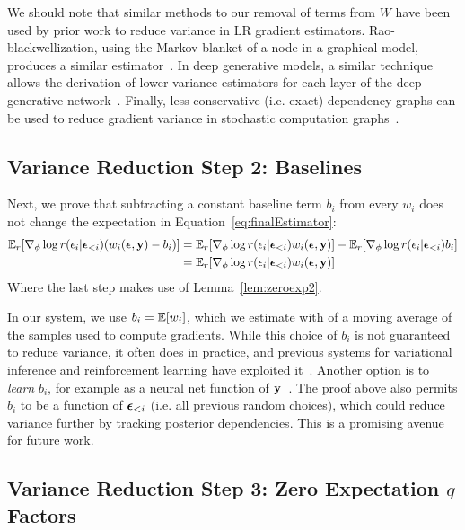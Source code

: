 We should note that similar methods to our removal of terms from $W$ have been used by prior work to reduce variance in LR gradient estimators. Rao-blackwellization, using the Markov blanket of a node in a graphical model, produces a similar estimator~\cite{BBVI}. In deep generative models, a similar technique allows the derivation of lower-variance estimators for each layer of the deep generative network~\cite{NVIL}. Finally, less conservative (i.e. exact) dependency graphs can be used to reduce gradient variance in stochastic computation graphs~\cite{StochasticComputationGraphs}.

\subsection{Variance Reduction Step 2: Baselines}

Next, we prove that subtracting a constant baseline term $b_i$ from every $w_i$ does not change the expectation in Equation~\ref{eq:finalEstimator}:
\begin{align*}
\expect_\reparamDist [ \gradparams \log \reparamDist(\reparamVar_i | \reparamVars_{<i}) (w_i(\reparamVars, \observedVars) - b_i) ]
%
&= \expect_\reparamDist [ \gradparams \log \reparamDist(\reparamVar_i | \reparamVars_{<i}) w_i(\reparamVars, \observedVars) ] - \expect_\reparamDist[ \gradparams \log \reparamDist(\reparamVar_i | \reparamVars_{<i}) b_i ]\\
%
&= \expect_\reparamDist [ \gradparams \log \reparamDist(\reparamVar_i | \reparamVars_{<i}) w_i(\reparamVars, \observedVars) ] 
\end{align*}
Where the last step makes use of Lemma~\ref{lem:zeroexp2}.

In our system, we use $b_i = \mathbb{E}[ w_i ]$, which we estimate with of a moving average of the samples used to compute gradients. While this choice of $b_i$ is not guaranteed to reduce variance, it often does in practice, and previous systems for variational inference and reinforcement learning have exploited it~\cite{BBVI,StochasticComputationGraphs,VarianceReduction}. Another option is to \emph{learn} $b_i$, for example as a neural net function of $\mathbf{y}$~\cite{NVIL}. The proof above also permits $b_i$ to be a function of $\bm{\epsilon}_{<i}$ (i.e. all previous random choices), which could reduce variance further by tracking posterior dependencies. This is a promising avenue for future work.

\subsection{Variance Reduction Step 3: Zero Expectation $q$ Factors}

